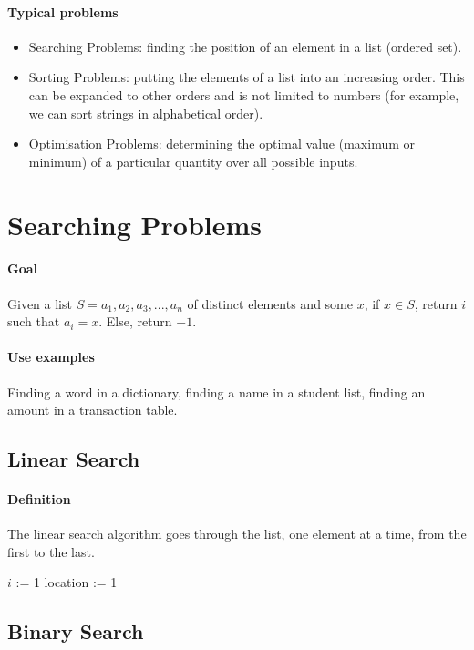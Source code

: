 \documentclass[10pt,a4paper]{book}
\begin{document}
\paragraph*{Typical problems}
\begin{itemize}
\item Searching Problems: finding the position of an element in a list (ordered set).
\item Sorting Problems: putting the elements of a list into an increasing order. This can be expanded to other orders and is not limited to numbers (for example, we can sort strings in alphabetical order).
\item Optimisation Problems: determining the optimal value (maximum or minimum) of a particular quantity over all possible inputs. 
\end{itemize}

\section{Searching Problems}
\paragraph*{Goal}
Given a list $S = a_{1},a_{2},a_{3},...,a_{n}$ of distinct elements and some $x$, if $x \in S$, return $i$ such that $a_{i} = x$. Else, return $-1$.
\paragraph*{Use examples}
Finding a word in a dictionary, finding a name in a student list, finding an amount in a transaction table.

\subsection{Linear Search}
\paragraph*{Definition}
The linear search algorithm goes through the list, one element at a time, from the first to the last.
\begin{algorithm}
\DontPrintSemicolon
$i$ := 1\;
location := 1\;
\end{algorithm}

\subsection{Binary Search}
\end{document}
